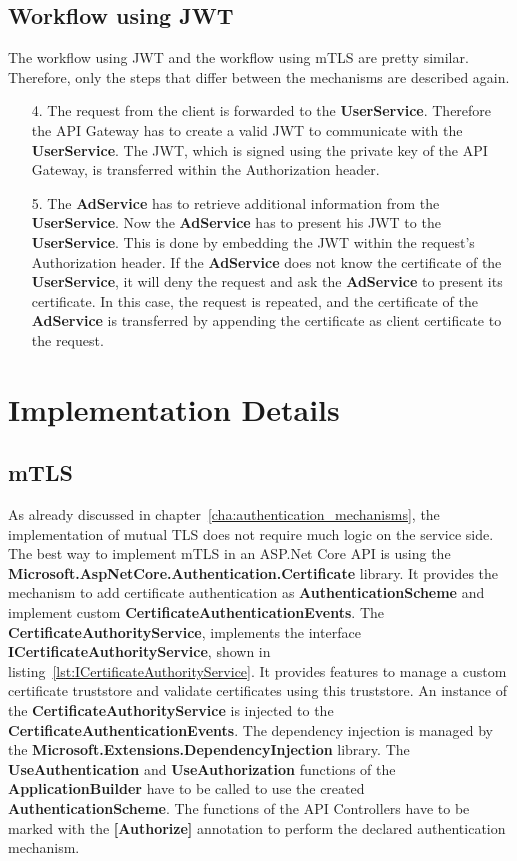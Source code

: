 \subsection{Workflow using JWT}
The workflow using JWT and the workflow using mTLS are pretty similar.
Therefore, only the steps that differ between the mechanisms are described again.
\begin{enumerate}
	\item[4.] The request from the client is forwarded to the \textbf{UserService}. 
		Therefore the API Gateway has to create a valid JWT to communicate with the \textbf{UserService}.
		The JWT, which is signed using the private key of the API Gateway, is transferred within the Authorization header.
	\item[5.] The \textbf{AdService} has to retrieve additional information from the \textbf{UserService}.
		Now the \textbf{AdService} has to present his JWT to the \textbf{UserService}.
		This is done by embedding the JWT within the request's Authorization header.
		If the \textbf{AdService} does not know the certificate of the \textbf{UserService}, it will deny the request and ask the \textbf{AdService} to present its certificate.
		In this case, the request is repeated, and the certificate of the \textbf{AdService} is transferred by appending the certificate as client certificate to the request.
\end{enumerate}

\section{Implementation Details}

\subsection{mTLS} \label{sec:impl_details_mtls}
As already discussed in chapter~\ref{cha:authentication_mechanisms}, the implementation of mutual TLS does not require much logic on the service side.
The best way to implement mTLS in an ASP.Net Core API is using the \textbf{Microsoft.AspNetCore.Authentication.Certificate} library.
It provides the mechanism to add certificate authentication as \textbf{AuthenticationScheme} and implement custom \textbf{CertificateAuthenticationEvents}.
The \textbf{CertificateAuthorityService}, implements the interface \textbf{ICertificateAuthorityService}, shown in listing~\ref{lst:ICertificateAuthorityService}.
It provides features to manage a custom certificate truststore and validate certificates using this truststore.
An instance of the \textbf{CertificateAuthorityService} is injected to the \textbf{CertificateAuthenticationEvents}.
The dependency injection is managed by the \textbf{Microsoft.Extensions.DependencyInjection} library.
The \textbf{UseAuthentication} and \textbf{UseAuthorization} functions of the \textbf{ApplicationBuilder} have to be called to use the created \textbf{AuthenticationScheme}.
The functions of the API Controllers have to be marked with the \textbf{[Authorize]} annotation to perform the declared authentication mechanism.

